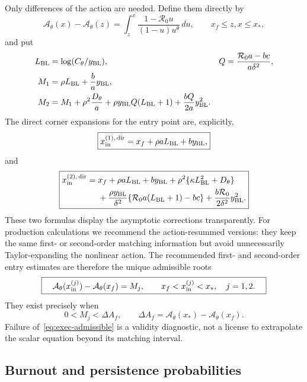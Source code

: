 \documentclass[11pt,a4paper]{article}
\newcommand{\Rzero}{\mathcal R_0}
\newcommand{\Afun}{\mathcal A_\theta}
\newcommand{\BL}{y_{\rm BL}}
\newcommand{\xf}{x_f}
\newcommand{\xs}{x_*}
\begin{document}
Only differences of the action are needed.  Define them directly by
\begin{equation}
 \Afun(x)-\Afun(z)=\int_z^x
 \frac{1-\Rzero u}{(1-u)u^\theta}\,du,
 \qquad \xf\leq z,x\leq\xs,
 \label{eq:exec-action}
\end{equation}
and put
\begin{align*}
 L_{\rm BL}&=\log(C_\theta/\BL),
 &Q&=\frac{\Rzero a-bc}{a\delta^2},\\
 M_1&=\rho L_{\rm BL}+\frac ba\BL,\\
 M_2&=M_1+\rho^2\frac{D_\theta}{a}
 +\rho\BL Q(L_{\rm BL}+1)+\frac{bQ}{2a}\BL^2.
\end{align*}
The direct corner expansions for the entry point are, explicitly,
\begin{equation}
 \boxed{
 x_{\rm in}^{(1),\,\mathrm{dir}}
 =\xf+\rho aL_{\rm BL}+b\BL,}
 \label{eq:exec-xin-direct1}
\end{equation}
and
\begin{equation}
 \boxed{\begin{aligned}
 x_{\rm in}^{(2),\,\mathrm{dir}}
 ={}&\xf+\rho aL_{\rm BL}+b\BL
 +\rho^2\{\kappa L_{\rm BL}^2+D_\theta\}\\
 &+\frac{\rho\BL}{\delta^2}
 \{\Rzero a(L_{\rm BL}+1)-bc\}
 +\frac{b\Rzero}{2\delta^2}\BL^2.
 \end{aligned}}
 \label{eq:exec-xin-direct2}
\end{equation}
These two formulas display the asymptotic corrections transparently.  For
production calculations we recommend the action-resummed versions: they keep
the same first- or second-order matching information but avoid unnecessarily
Taylor-expanding the nonlinear action.  The recommended first- and second-order
entry estimates are therefore the unique admissible roots
\begin{equation}
 \boxed{\quad
 \Afun(x_{\rm in}^{(j)})-\Afun(\xf)=M_j,
 \qquad \xf<x_{\rm in}^{(j)}<\xs,
 \quad j=1,2.\quad}
 \label{eq:exec-xin}
\end{equation}
They exist precisely when
\begin{equation}
 0<M_j<\Delta A_f,
 \qquad \Delta A_f=\Afun(\xs)-\Afun(\xf).
 \label{eq:exec-admissible}
\end{equation}
Failure of~\eqref{eq:exec-admissible} is a validity diagnostic, not a license
to extrapolate the scalar equation beyond its matching interval.

\subsection{Burnout and persistence probabilities}
\end{document}
